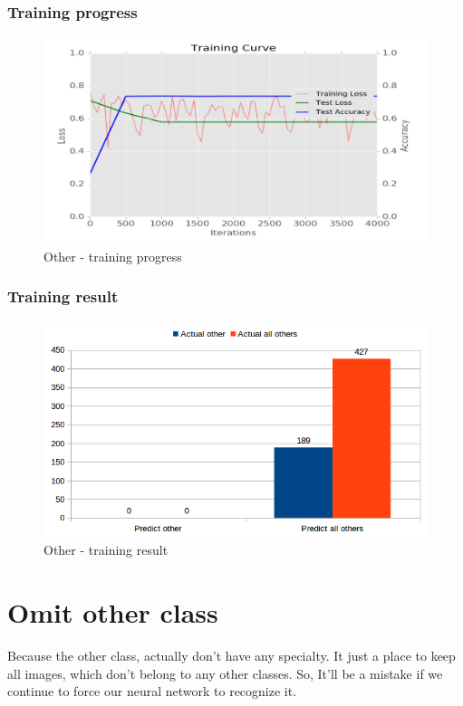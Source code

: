\documentclass[11pt]{article}
\begin{document}
\subsubsection{Training progress}

\begin{figure}[H]
\centering
\includegraphics[width=1\textwidth]{images/train_only_other}
\caption{Other - training progress}
\end{figure}

\subsubsection{Training result}

\begin{figure}[H]
\centering
\includegraphics[width=1\textwidth]{images/other}
\caption{Other - training result}
\end{figure}

\section{Omit other class}
Because the other class, actually don't have any specialty. It just a place to keep all images, which don't belong to any other classes. So, It'll be a mistake if we continue to force our neural network to recognize it. 
\end{document}
